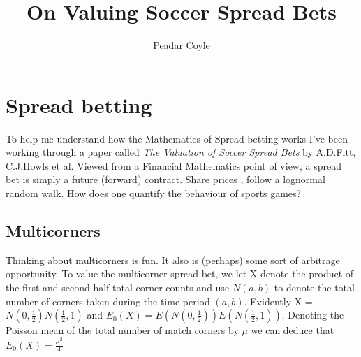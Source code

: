 \documentclass[12pt, oneside, a4paper]{article}
\title{\bf On Valuing Soccer Spread Bets}
\author{Peadar Coyle}
\theoremstyle{definition}
\begin{document}
\maketitle
\section{Spread betting}
To help me understand how the Mathematics of Spread betting works I've been working through a paper 
called \textit{The Valuation of Soccer Spread Bets} by A.D.Fitt, C.J.Howls et al.
Viewed from a Financial Mathematics point of view, a spread bet is simply a future (forward) contract. Share prices
, follow a lognormal random walk. 
How does one quantify the behaviour of sports games? 
\subsection{Multicorners}
Thinking about multicorners is fun. It also is (perhaps) some sort of arbitrage opportunity. 
To value the multicorner spread bet, we let X denote the product of the first and second half total corner counts and use 
$N(a,b)$ to denote the total number of corners taken during the time period $(a,b)$. Evidently X = $N(0,\frac{1}{2})
N(\frac{1}{2}, 1)$ and $E_{0}(X)= E(N(0,\frac{1}{2}))E(
N(\frac{1}{2}, 1))$. Denoting the Poisson mean of the total number of match corners by $\mu$ we can deduce that $E_{0}(X)
= \frac{\mu^{2}}{4}$
\end{document}
